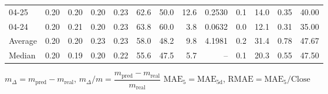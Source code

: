 \begin{threeparttable}
{\begin{tabular}{lrrrrrrrrrrrr}
  04-25 &          0.20 &          0.20 &          0.20 &        0.23 &                62.6 &                50.0 &       12.6 &       0.2530 &                 0.1 &             14.0 &            0.35 &                  40.00 \\
  04-24 &          0.20 &          0.21 &          0.20 &        0.23 &                63.8 &                60.0 &        3.8 &       0.0632 &                 0.0 &             12.1 &            0.31 &                  35.00 \\
Average &          0.20 &          0.20 &          0.23 &        0.23 &                58.0 &                48.2 &        9.8 &       4.1981 &                 0.2 &             31.4 &            0.78 &                  47.67 \\
 Median &          0.20 &          0.19 &          0.20 &        0.22 &                55.6 &                47.5 &        5.7 &           -- &                 0.1 &             20.3 &            0.55 &                  47.50 \\
\bottomrule
\end{tabular}
}
\begin{tablenotes}\footnotesize
\item $m_\Delta=m_{\text{pred}}-m_{\text{real}}$,
$m_\Delta/m=\dfrac{m_{\text{pred}}-m_{\text{real}}}{m_{\text{real}}}$
$\mathrm{MAE}_5=\mathrm{MAE}_{5\text{d}}$,
$\mathrm{RMAE}=\mathrm{MAE}_5/\text{Close}$
\end{tablenotes}
\end{threeparttable}
\endgroup

